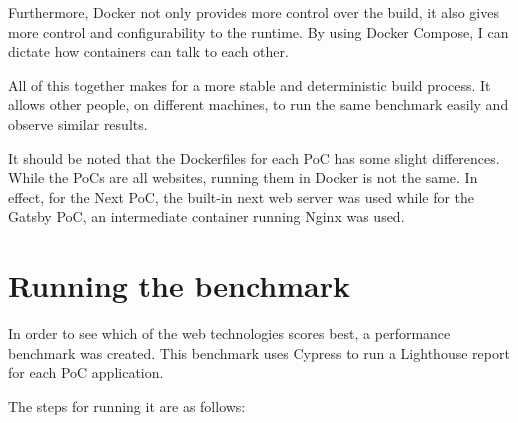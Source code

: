Furthermore, Docker not only provides more control over the build, it also gives more control and configurability to the runtime. 
By using Docker Compose, I can dictate how containers can talk to each other.

All of this together makes for a more stable and deterministic build process. 
It allows other people, on different machines, to run the same benchmark easily and observe similar results.

It should be noted that the Dockerfiles for each PoC has some slight differences.
While the PoCs are all websites, running them in Docker is not the same. 
In effect, for the Next PoC, the built-in next web server was used while for the Gatsby PoC, an intermediate container running Nginx was used.

\section{Running the benchmark}

In order to see which of the web technologies scores best, a performance benchmark was created. 
This benchmark uses Cypress to run a Lighthouse report for each PoC application.

The steps for running it are as follows:

